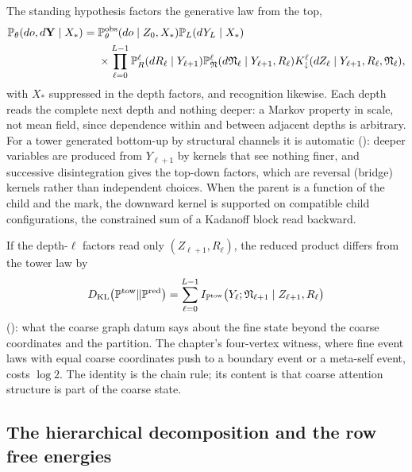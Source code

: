 The standing hypothesis  factors the generative law from the top,
\[
\begin{aligned}
\mathbb P_\theta(do,d\mathbf Y\mid X_*)
={}&\mathbb P^{\mathrm{obs}}_\theta(do\mid Z_0,X_*)\mathbb P_L(dY_L\mid X_*)\\
&\times\prod_{\ell=0}^{L-1}\mathbb P^\ell_R(dR_\ell\mid Y_{\ell+1})
\mathbb P^\ell_{\mathfrak N}(d\mathfrak N_\ell\mid Y_{\ell+1},R_\ell)
K^\ell_\downarrow(dZ_\ell\mid Y_{\ell+1},R_\ell,\mathfrak N_\ell),
\end{aligned}
\]
with $X_*$ suppressed in the depth factors, and recognition likewise. Each depth reads the complete next
depth and nothing deeper: a Markov property in scale, not mean field, since dependence within and between
adjacent depths is arbitrary. For a tower generated bottom-up by structural channels it is automatic
(): deeper variables are produced from $Y_{\ell+1}$ by kernels that
see nothing finer, and successive disintegration gives the top-down factors, which are reversal (bridge)
kernels rather than independent choices. When the parent is a function of the child and the mark, the
downward kernel is supported on compatible child configurations, the constrained sum of a Kadanoff block
read backward.

If the depth-$\ell$ factors read only $(Z_{\ell+1},R_\ell)$, the reduced product differs from the tower
law by
\[
D_{\mathrm{KL}}\bigl(\mathbb P^{\mathrm{tow}}\Vert\mathbb P^{\mathrm{red}}\bigr)
=\sum_{\ell=0}^{L-1}I_{\mathbb P^{\mathrm{tow}}}\bigl(Y_\ell;\mathfrak N_{\ell+1}\mid Z_{\ell+1},R_\ell\bigr)
\]
(): what the coarse graph datum says about the fine state beyond the
coarse coordinates and the partition. The chapter's four-vertex witness, where fine event laws with equal
coarse coordinates push to a boundary event or a meta-self event, costs $\log2$. The identity is the
chain rule; its content is that coarse attention structure is part of the coarse state.

\subsection{The hierarchical decomposition and the row free energies}

